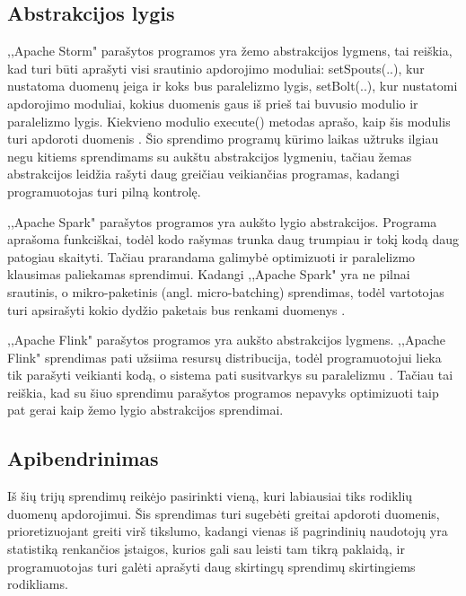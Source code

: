 \documentclass{VUMIFPSkursinis}
\begin{document}
\subsection{Abstrakcijos lygis}

,,Apache Storm" parašytos programos yra žemo abstrakcijos lygmens, tai reiškia, kad turi būti aprašyti visi srautinio apdorojimo moduliai: 
setSpouts(..), kur nustatoma duomenų įeiga ir koks bus paralelizmo lygis, setBolt(..), kur nustatomi apdorojimo moduliai,
kokius duomenis gaus iš prieš tai buvusio modulio ir paralelizmo lygis. Kiekvieno modulio execute() metodas aprašo, kaip šis modulis 
turi apdoroti duomenis \cite{tutpoint}. Šio sprendimo programų kūrimo laikas užtruks ilgiau negu kitiems sprendimams su aukštu abstrakcijos lygmeniu,
tačiau žemas abstrakcijos leidžia rašyti daug greičiau veikiančias programas, kadangi programuotojas turi pilną kontrolę.

,,Apache Spark" parašytos programos yra aukšto lygio abstrakcijos. 
Programa aprašoma funkciškai, todėl kodo rašymas trunka daug trumpiau ir tokį kodą daug patogiau skaityti. Tačiau prarandama galimybė optimizuoti
ir paralelizmo klausimas paliekamas sprendimui. Kadangi ,,Apache Spark" yra ne pilnai srautinis, o mikro-paketinis (angl. micro-batching) 
sprendimas, todėl vartotojas turi apsirašyti kokio dydžio paketais bus renkami duomenys \cite{shoro2015big}.

,,Apache Flink" parašytos programos yra aukšto abstrakcijos lygmens. ,,Apache Flink" 
sprendimas pati užsiima resursų distribucija, todėl programuotojui lieka tik parašyti veikianti kodą, o sistema pati susitvarkys su paralelizmu \cite{flinkdoc}. Tačiau 
tai reiškia, kad su šiuo sprendimu parašytos programos nepavyks optimizuoti taip pat gerai kaip žemo lygio abstrakcijos sprendimai.

\subsection{Apibendrinimas}
Iš šių trijų sprendimų reikėjo pasirinkti vieną, kuri labiausiai tiks rodiklių duomenų apdorojimui. Šis sprendimas turi sugebėti greitai apdoroti duomenis,
prioretizuojant greiti virš tikslumo, kadangi vienas iš pagrindinių naudotojų yra statistiką renkančios įstaigos, kurios gali sau leisti tam tikrą paklaidą,
ir programuotojas turi galėti aprašyti daug skirtingų sprendimų skirtingiems rodikliams.\par
\end{document}
